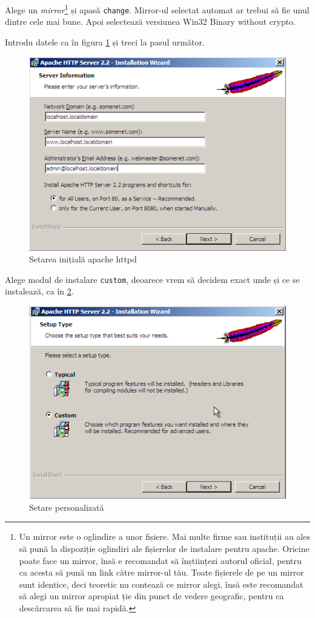 Alege un \textsl{mirror}\footnote{
Un mirror este o oglindire a unor fișiere. Mai multe firme sau instituții au ales
să pună la dispoziție oglindiri ale fișierelor de instalare pentru apache. Oricine
poate face un mirror, însă e recomandat să înștiințezi autorul oficial, pentru
ca acesta să pună un link către mirror-ul tău. Toate fișierele de pe un mirror sunt identice,
deci teoretic nu contează ce mirror alegi, însă este recomandat să alegi un mirror
apropiat ție din punct de vedere geografic, pentru ca descărcarea să fie mai
rapidă.} și apasă \texttt{change}. Mirror-ul selectat automat ar trebui să fie unul
dintre cele mai bune. Apoi selectează versiunea {\glqq}Win32 Binary without crypto{\grqq}.


Introdu datele ca în figura \ref{fig:httpd setup} și treci la pasul următor.

\begin{figure}[ht!]
  \centering
    \includegraphics[width=300bp]{cap01/Screenshot-2.png}
  \caption{Setarea inițială apache httpd}
  \label{fig:httpd setup}
\end{figure}

Alege modul de instalare \texttt{custom}, deoarece vrem să decidem exact unde și ce
se instalează, ca în \ref{fig:httpd check custom setup}.

\begin{figure}[ht!]
  \centering
    \includegraphics[width=250bp]{cap01/Screenshot-3.png}
  \caption{Setare personalizată}
  \label{fig:httpd check custom setup}
\end{figure}

